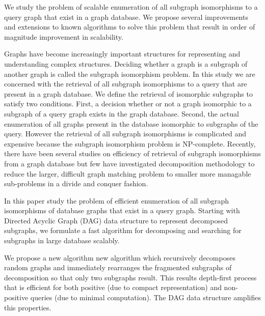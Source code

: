We study the problem of scalable enumeration of all subgraph isomorphisms to a query graph that exist in a graph database. We  propose several improvements and extensions to known algorithms to solve this problem that result in order of magnitude improvement in scalability. 

Graphs have become increasingly important structures for representing and understanding complex structures. Deciding whether a graph is a subgraph of another graph is called the subgraph isomorphism problem. In this study we are concerned with the retrieval of all subgraph isomorphisms to a query that are present in a graph database.
We define the retrieval of isomorphic subgraphs to satisfy two conditions.  First, a decision whether or not a graph isomorphic to a subgraph of a query graph exists in the graph database. Second, the actual enumeration of all graphs present in the database isomorphic to subgraphs of the query. However the retrieval of all subgraph isomorphisms is complicated and expensive because the subgraph isomorphism problem is NP-complete.
Recently, there have been several studies on efficiency of retrieval of subgraph isomorphisms from a graph database but few have investigated decomposition methodology to reduce the larger, difficult graph matching problem to smaller more managable sub-problems in a divide and conquer fashion. 




In this paper study the problem of efficient enumeration of all subgraph isomorphisms of database graphs that exist in a query graph. Starting with Directed Acyclic Graph (DAG) data structure to represent decomposed subgraphs, we formulate a fast algorithm for decomposing and searching for subgraphs in large database scalably.

We propose a new algorithm new algorithm which recursively decomposes random graphs and immediately rearranges the fragmented subgraphs of decomposition so that only two subgraphs result. This results depth-first process that is efficient for both positive (due to compact representation) and non-positive queries (due to minimal computation). The DAG data structure amplifies this properties.

